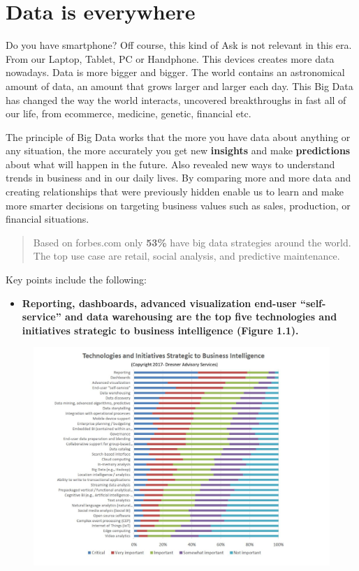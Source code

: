 \documentclass[]{book}
\providecommand{\tightlist}{%
  \setlength{\itemsep}{0pt}\setlength{\parskip}{0pt}}
\begin{document}
\chapter{Data is everywhere}\label{data-is-everywhere}

Do you have smartphone? Off course, this kind of Ask is not relevant in
this era. From our Laptop, Tablet, PC or Handphone. This devices creates
more data nowadays. Data is more bigger and bigger. The world contains
an astronomical amount of data, an amount that grows larger and larger
each day. This Big Data has changed the way the world interacts,
uncovered breakthroughs in fast all of our life, from ecommerce,
medicine, genetic, financial etc.

The principle of Big Data works that the more you have data about
anything or any situation, the more accurately you get new
\textbf{insights} and make \textbf{predictions} about what will happen
in the future. Also revealed new ways to understand trends in business
and in our daily lives. By comparing more and more data and creating
relationships that were previously hidden enable us to learn and make
more smarter decisions on targeting business values such as sales,
production, or financial situations.

\begin{quote}
Based on forbes.com only \textbf{53\%} have big data strategies around
the world. The top use case are retail, social analysis, and predictive
maintenance.
\end{quote}

Key points include the following:

\begin{itemize}
\tightlist
\item
  \textbf{Reporting, dashboards, advanced visualization end-user
  ``self-service'' and data warehousing are the top five technologies
  and initiatives strategic to business intelligence (Figure 1.1).}
\end{itemize}

\begin{figure}
\centering
\includegraphics{1.jpg}
\caption{}
\end{figure}
\end{document}
